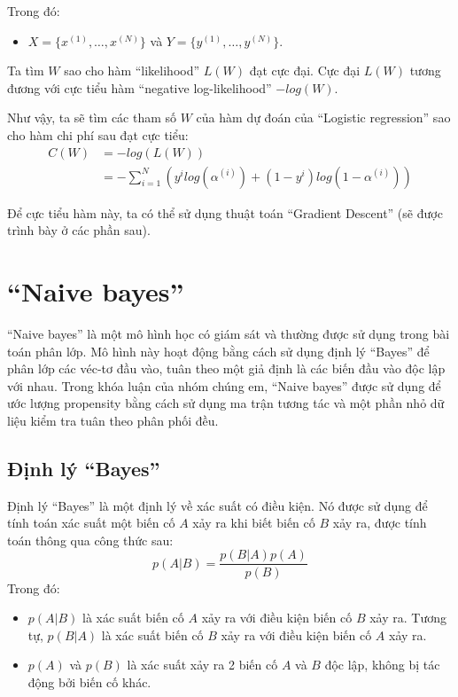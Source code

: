 Trong đó:
\begin{itemize}
    \item $X = \{x^{(1)}, \dots, x^{(N)} \}$ và $Y = \{y^{(1)}, \dots, y^{(N)} \}$.
\end{itemize}

Ta tìm $W$ sao cho hàm ``likelihood'' $L(W)$ đạt cực đại. Cực đại $L(W)$ tương đương với cực tiểu hàm ``negative log-likelihood'' $-log(W)$.

Như vậy, ta sẽ tìm các tham số $W$ của hàm dự đoán của ``Logistic regression'' sao cho hàm chi phí sau đạt cực tiểu:
\begin{equation}\label{eq:2.2_C}
    \begin{split}
        C(W) &= -log(L(W))\\
        &= - \sum_{i=1}^{N} (y^{i} log(\alpha^{(i)}) + (1-y^{i})log(1-\alpha^{(i)}))
    \end{split}
\end{equation}


Để cực tiểu hàm này, ta có thể sử dụng thuật toán ``Gradient Descent'' (sẽ được trình bày ở các phần sau).
\section{``Naive bayes''}
``Naive bayes'' là một mô hình học có giám sát và thường được sử dụng trong bài toán phân lớp. Mô hình này hoạt động bằng cách sử dụng định lý ``Bayes'' để phân lớp các véc-tơ đầu vào, tuân theo một giả định là các biến đầu vào độc lập với nhau. Trong khóa luận của nhóm chúng em, ``Naive bayes'' được sử dụng để ước lượng propensity bằng cách sử dụng ma trận tương tác và một phần nhỏ dữ liệu kiểm tra tuân theo phân phối đều.
\subsection{Định lý ``Bayes''}
Định lý ``Bayes'' là một định lý về xác suất có điều kiện. Nó được sử dụng để tính toán xác suất một biến cố $A$ xảy ra khi biết biến cố $B$ xảy ra, được tính toán thông qua công thức sau:
\begin{equation}
    p(A|B) = \frac{p(B|A)p(A)}{p(B)}
    \label{eq:2.3_bayes}
\end{equation}
Trong đó:
\begin{itemize}
    \item $p(A|B)$ là xác suất biến cố $A$ xảy ra với điều kiện biến cố $B$ xảy ra. Tương tự, $p(B|A)$ là xác suất biến cố $B$ xảy ra với điều kiện biến cố $A$ xảy ra.
    \item $p(A)$ và $p(B)$ là xác suất xảy ra 2 biến cố $A$ và $B$ độc lập, không bị tác động bởi biến cố khác.
\end{itemize}
